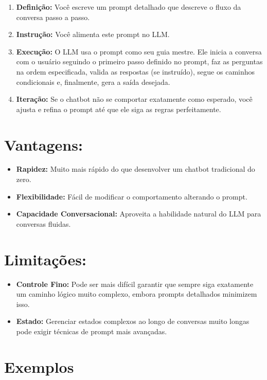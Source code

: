 \documentclass[14pt,a4paper,oneside]{book}
\begin{document}
\begin{enumerate}
    \item \textbf{Definição:} Você escreve um prompt detalhado que descreve o fluxo da conversa passo a passo.
    \item \textbf{Instrução:} Você alimenta este prompt no LLM.
    \item \textbf{Execução:} O LLM usa o prompt como seu guia mestre. Ele inicia a conversa com o usuário seguindo o primeiro passo definido no prompt, faz as perguntas na ordem especificada, valida as respostas (se instruído), segue os caminhos condicionais e, finalmente, gera a saída desejada.
    \item \textbf{Iteração:} Se o chatbot não se comportar exatamente como esperado, você ajusta e refina o prompt até que ele siga as regras perfeitamente.
\end{enumerate}

\section*{Vantagens:}

\begin{itemize}
    \item \textbf{Rapidez:} Muito mais rápido do que desenvolver um chatbot tradicional do zero.
    \item \textbf{Flexibilidade:} Fácil de modificar o comportamento alterando o prompt.
    \item \textbf{Capacidade Conversacional:} Aproveita a habilidade natural do LLM para conversas fluidas.
\end{itemize}

\section*{Limitações:}

\begin{itemize}
    \item \textbf{Controle Fino:} Pode ser mais difícil garantir que sempre siga exatamente um caminho lógico muito complexo, embora prompts detalhados minimizem isso.
    \item \textbf{Estado:} Gerenciar estados complexos ao longo de conversas muito longas pode exigir técnicas de prompt mais avançadas.
\end{itemize}

\section*{Exemplos}
\end{document}
